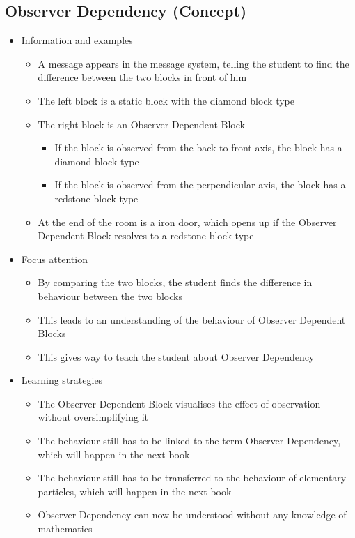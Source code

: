 \documentclass[11pt,twoside]{report} %
\begin{document}
\subsection{Observer Dependency (Concept)}
\begin{itemize}
	\item Information and examples
	\begin{itemize}
		\item A message appears in the message system, telling the student to find the difference between the two blocks in front of him
		\item The left block is a static block with the diamond block type
		\item The right block is an Observer Dependent Block
		\begin{itemize}
			\item If the block is observed from the back-to-front axis, the block has a diamond block type
			\item If the block is observed from the perpendicular axis, the block has a redstone block type
		\end{itemize}
		\item At the end of the room is a iron door, which opens up if the Observer Dependent Block resolves to a redstone block type
	\end{itemize}
	\item Focus attention
	\begin{itemize}
		\item By comparing the two blocks, the student finds the difference in behaviour between the two blocks
		\item This leads to an understanding of the behaviour of Observer Dependent Blocks
		\item This gives way to teach the student about Observer Dependency
	\end{itemize}
	\item Learning strategies
	\begin{itemize}
		\item The Observer Dependent Block visualises the effect of observation without oversimplifying it
		\item The behaviour still has to be linked to the term Observer Dependency, which will happen in the next book
		\item The behaviour still has to be transferred to the behaviour of elementary particles, which will happen in the next book
		\item Observer Dependency can now be understood without any knowledge of mathematics

\end{itemize}
\end{itemize}
\end{document}
